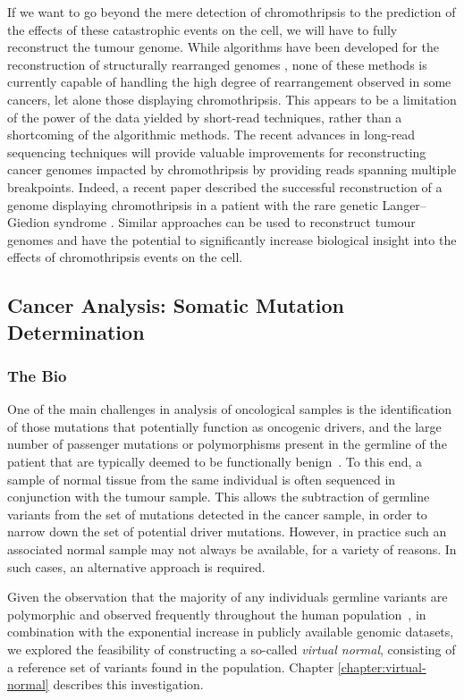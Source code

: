 If we want to go beyond the mere detection of chromothripsis to the prediction of the effects of these catastrophic events on the cell, we will have to fully reconstruct the tumour genome.
While algorithms have been developed for the reconstruction of structurally rearranged genomes \cite{prego,Baca2013}, none of these methods is currently capable of handling the high degree of rearrangement observed in some cancers, let alone those displaying chromothripsis.
This appears to be a limitation of the power of the data yielded by short-read techniques, rather than a shortcoming of the algorithmic methods.
The recent advances in long-read sequencing techniques will provide valuable improvements for reconstructing cancer genomes impacted by chromothripsis by providing reads spanning multiple breakpoints.
Indeed, a recent paper described the successful reconstruction of a genome displaying chromothripsis in a patient with the rare genetic Langer–Giedion syndrome \cite{lei2020long}.
Similar approaches can be used to reconstruct tumour genomes and have the potential to significantly increase biological insight into the effects of chromothripsis events on the cell.

\subsection{Cancer Analysis: Somatic Mutation Determination}
\subsubsection{The Bio}
One of the main challenges in analysis of oncological samples is the identification of those mutations that potentially function as oncogenic drivers, and the large number of passenger mutations or polymorphisms present in the germline of the patient that are typically deemed to be functionally benign~\cite{lawrence2013mutational}. To this end, a sample of normal tissue from the same individual is often sequenced in conjunction with the tumour sample. This allows the subtraction of germline variants from the set of mutations detected in the cancer sample, in order to narrow down the set of potential driver mutations. However, in practice such an associated normal sample may not always be available, for a variety of reasons. In such cases, an alternative approach is required.

Given the observation that the majority of any individuals germline variants are polymorphic and observed frequently throughout the human population~\cite{10002010map,10002012integrated}, in combination with the exponential increase in publicly available genomic datasets, we explored the feasibility of constructing a so-called \emph{virtual normal}, consisting of a reference set of variants found in the population. Chapter \ref{chapter:virtual-normal} describes this investigation.

